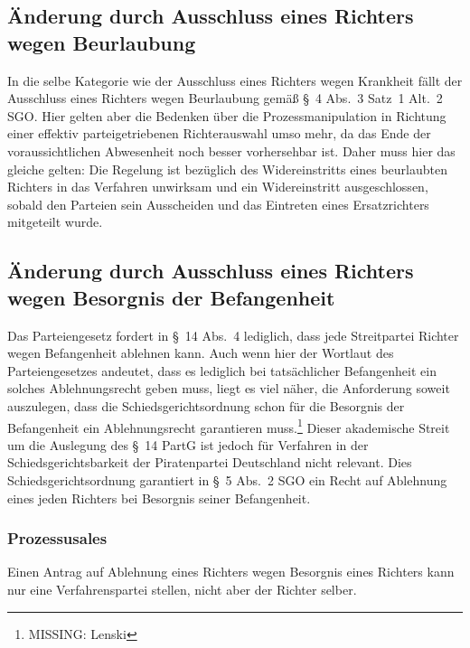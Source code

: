 \subsection{Änderung durch Ausschluss eines Richters wegen Beurlaubung}
\label{Zusammensetzung:Spruchkoerper:Urlaub}
In die selbe Kategorie wie der Ausschluss eines Richters wegen Krankheit fällt der Ausschluss eines Richters wegen Beurlaubung gemäß \S~4 Abs.~3 Satz~1 Alt.~2 SGO.
Hier gelten aber die Bedenken über die Prozessmanipulation in Richtung einer effektiv parteigetriebenen Richterauswahl umso mehr, da das Ende der voraussichtlichen Abwesenheit noch besser vorhersehbar ist.
Daher muss hier das gleiche gelten: Die Regelung ist bezüglich des Widereinstritts eines beurlaubten Richters in das Verfahren unwirksam und ein Widereinstritt ausgeschlossen, sobald den Parteien sein Ausscheiden und das Eintreten eines Ersatzrichters mitgeteilt wurde.

\subsection{Änderung durch Ausschluss eines Richters wegen Besorgnis der Befangenheit}
\label{Zusammensetzung:Spruchkoerper:Befangenheitsbesorgnis}
Das Parteiengesetz fordert in \S~14 Abs.~4 lediglich, dass jede Streitpartei Richter wegen Befangenheit ablehnen kann.
Auch wenn hier der Wortlaut des Parteiengesetzes andeutet, dass es lediglich bei tatsächlicher Befangenheit ein solches Ablehnungsrecht geben muss, liegt es viel näher, die Anforderung soweit auszulegen, dass die Schiedsgerichtsordnung schon für die Besorgnis der Befangenheit ein Ablehnungsrecht garantieren muss.\footnote{MISSING: Lenski}
Dieser akademische Streit um die Auslegung des \S~14 PartG ist jedoch für Verfahren in der Schiedsgerichtsbarkeit der Piratenpartei Deutschland nicht relevant.
Dies Schiedsgerichtsordnung garantiert in \S~5 Abs.~2 SGO ein Recht auf Ablehnung eines jeden Richters bei Besorgnis seiner Befangenheit.


\subsubsection{Prozessusales}
\label{Zusammensetzung:Spruchkoerper:Befangenheitsbesorgnis:Prozessuales}
Einen Antrag auf Ablehnung eines Richters wegen Besorgnis eines Richters kann nur eine Verfahrenspartei stellen, nicht aber der Richter selber.


